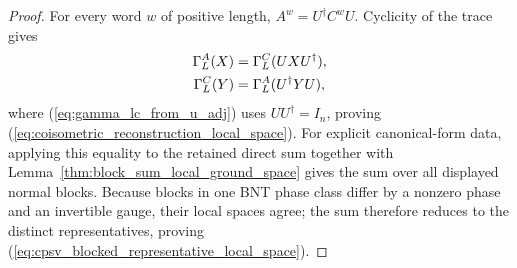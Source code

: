 \begin{proof}
    \leanok
    For every word $w$ of positive length,
    $A^w=U^\dagger C^wU$. Cyclicity of the trace gives
    \begin{align}
        \Gamma_L^A(X)
         & =\Gamma_L^C(UXU^\dagger),
        \notag                        \\
        \Gamma_L^C(Y)
         & =\Gamma_L^A(U^\dagger YU),
        \label{eq:gamma_lc_from_u_adj}
    \end{align}
    where (\ref{eq:gamma_lc_from_u_adj}) uses $UU^\dagger=I_n$, proving
    (\ref{eq:coisometric_reconstruction_local_space}). For explicit
    canonical-form data, applying this equality to the retained direct sum
    together with Lemma~\ref{thm:block_sum_local_ground_space} gives the sum
    over all displayed normal blocks. Because blocks in one BNT phase class
    differ by a nonzero phase and an invertible gauge, their local spaces
    agree; the sum therefore reduces to the distinct representatives, proving
    (\ref{eq:cpsv_blocked_representative_local_space}).
\end{proof}

